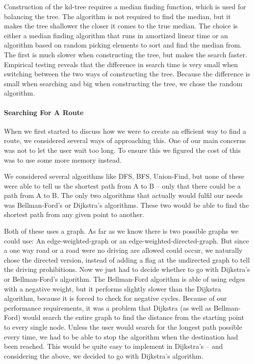 \documentclass[a4paper,10pt,titlepage]{article}
\begin{document}
Construction of the kd-tree requires a median finding function, which is used for balancing the tree. The algorithm is not required to find the median, but it makes the tree shallower the closer it comes to the true median. The choice is either a median finding algorithm that runs in amortized linear time or an algorithm based on random picking elements to sort and find the median from. The first is much slower when constructing the tree, but makes the search faster. Empirical testing reveals that the difference in search time is very small when switching between the two ways of constructing the tree. Because the difference is small when searching and big when constructing the tree, we chose the random algorithm.\\

\paragraph{Searching For A Route}
When we first started to discuss how we were to create an efficient way to find a route, we considered several ways of approaching this. One of our main concerns was not to let the user wait too long. To ensure this we figured the cost of this was to use some more memory instead. 

We considered several algorithms like DFS, BFS, Union-Find, but none of these were able to tell us the shortest path from A to B – only that there could be a path from A to B. The only two algorithms that actually would fulfil our needs was Bellman-Ford’s or Dijkstra’s algorithms. These two would be able to find the shortest path from any given point to another. 

Both of these uses a graph. As far as we know there is two possible graphs we could use: An edge-weighted-graph or an edge-weighted-directed-graph. But since a one way road or a road were no driving are allowed could occur, we naturally chose the directed version, instead of adding a flag at the undirected graph to tell the driving prohibitions. Now we just had to decide whether to go with Dijkstra’s or Bellman-Ford’s algorithm.
The Bellman-Ford algorithm is able of using edges with a negative weight, but it performs slightly slower than the  Dijkstra algorithm, because it is forced to check for negative cycles. Because of our performance requirements, it was a problem that Dijkstra (as well as Bellman-Ford) would search the entire graph to find the distance from the starting point to every single node. Unless the user would search for the longest path possible every time, we had to be able to stop the algorithm when the destination had been reached. This would be quite easy to implement in Dijkstra’s – and considering the above, we decided to go with Dijkstra’s algorithm.
\end{document}
